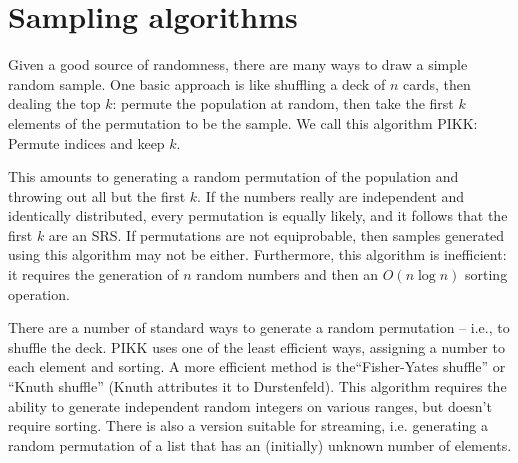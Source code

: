 \documentclass[graybox]{svmult}
\begin{document}
\section{Sampling algorithms}
\label{sec:algorithms}


Given a good source of randomness, there are many ways to draw a simple random sample.
One basic approach is like shuffling a deck of $n$ cards, then dealing the top $k$:
permute the population at random, then take the first $k$ elements of the permutation to be the sample.
We call this algorithm PIKK: Permute indices and keep $k$.

This amounts to generating a random permutation of the population and throwing out all but the first $k$.
If the numbers really are independent and identically distributed, every permutation is equally likely, and it follows that the first $k$ are an SRS.
If permutations are not equiprobable, then samples generated using this algorithm may not be either.
Furthermore, this algorithm is inefficient: it requires the generation of $n$ random numbers and then an $O(n\log n)$ sorting operation.


%

There are a number of standard ways to generate a random permutation -- i.e., to shuffle the deck.
PIKK uses one of the least efficient ways, assigning a number to each element and sorting.
A more efficient method is the``Fisher-Yates shuffle'' or ``Knuth shuffle'' (Knuth attributes it to Durstenfeld).
This algorithm requires the ability to generate independent random integers on various ranges, but doesn't require sorting.
There is also a version suitable for streaming, i.e. generating a random permutation of a list that has an (initially) unknown number of elements.
\end{document}
